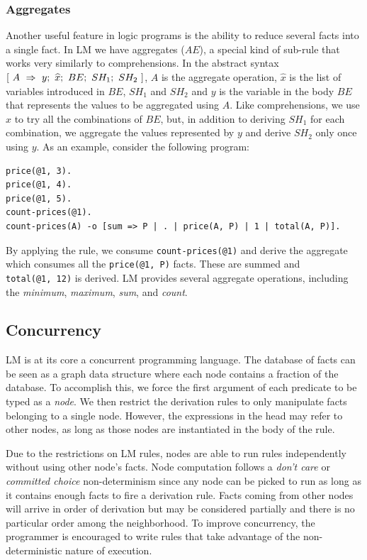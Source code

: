 \subsubsection{Aggregates}

Another useful feature in logic programs is the ability to reduce several facts into a single fact.
In LM we have aggregates ($AE$), a special kind of sub-rule that works very similarly to comprehensions.
In the abstract syntax $[~A~\Rightarrow~y;~\widehat{x};~BE;~SH_1;~SH_2~]$, $A$ is the aggregate operation, $\widehat{x}$ is the list of variables
introduced in $BE$, $SH_1$ and $SH_2$ and $y$ is the variable in the body
$BE$ that represents the values to be aggregated using $A$. Like comprehensions,
we use $\widehat{x}$ to try all the combinations of $BE$, but, in addition to deriving $SH_1$ for each combination,
we aggregate the values represented by $y$ and derive $SH_2$ only once using $y$.
As an example, consider the following program:

{\footnotesize
\begin{Verbatim}
price(@1, 3).
price(@1, 4).
price(@1, 5).
count-prices(@1).
count-prices(A) -o [sum => P | . | price(A, P) | 1 | total(A, P)].
\end{Verbatim}
}

By applying the rule, we consume \texttt{count-prices(@1)} and
derive the aggregate which consumes all the \texttt{price(@1, P)} facts.
These are summed and \texttt{total(@1,~12)} is derived.  
LM provides several aggregate operations, including the \emph{minimum}, \emph{maximum}, \emph{sum}, and \emph{count}.

\subsection{Concurrency}

LM is at its core a concurrent programming language.
The database of facts can be seen as a graph data structure where each node contains a fraction of the database.
To accomplish this, we force the first argument of each predicate to be typed as a \emph{node}. We then
restrict the derivation rules to only manipulate facts belonging to a single node.
However, the expressions in the head may refer to other nodes, as long as those nodes are instantiated in the body of the rule.

Due to the restrictions on LM rules, nodes are able to
run rules independently without using other node's facts. Node computation follows a
\emph{don't care} or \emph{committed choice} non-determinism
since any node can be picked to run as long as it contains enough facts to fire a derivation rule.
Facts coming from other nodes will arrive in order of derivation but may be considered
partially and there is no particular order among the neighborhood. To improve concurrency,
the programmer is encouraged to write rules that take advantage of the non-deterministic nature of execution.